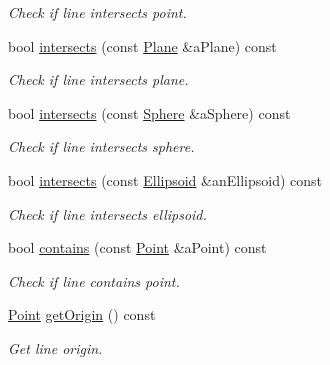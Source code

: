 \begin{DoxyCompactItemize}
\begin{DoxyCompactList}\small\item\em Check if line intersects point. \end{DoxyCompactList}\item 
bool \hyperlink{classlibrary_1_1math_1_1geom_1_1d3_1_1objects_1_1_line_a21d031807956bafc5577ed3b5ac54cbf}{intersects} (const \hyperlink{classlibrary_1_1math_1_1geom_1_1d3_1_1objects_1_1_plane}{Plane} \&a\+Plane) const
\begin{DoxyCompactList}\small\item\em Check if line intersects plane. \end{DoxyCompactList}\item 
bool \hyperlink{classlibrary_1_1math_1_1geom_1_1d3_1_1objects_1_1_line_ab9b35d1e6276d927e9a54219855295ce}{intersects} (const \hyperlink{classlibrary_1_1math_1_1geom_1_1d3_1_1objects_1_1_sphere}{Sphere} \&a\+Sphere) const
\begin{DoxyCompactList}\small\item\em Check if line intersects sphere. \end{DoxyCompactList}\item 
bool \hyperlink{classlibrary_1_1math_1_1geom_1_1d3_1_1objects_1_1_line_a2cc1edf1b60745c518fbf19f2ab0771c}{intersects} (const \hyperlink{classlibrary_1_1math_1_1geom_1_1d3_1_1objects_1_1_ellipsoid}{Ellipsoid} \&an\+Ellipsoid) const
\begin{DoxyCompactList}\small\item\em Check if line intersects ellipsoid. \end{DoxyCompactList}\item 
bool \hyperlink{classlibrary_1_1math_1_1geom_1_1d3_1_1objects_1_1_line_a59b72a3a39134963f5165a03829b17aa}{contains} (const \hyperlink{classlibrary_1_1math_1_1geom_1_1d3_1_1objects_1_1_point}{Point} \&a\+Point) const
\begin{DoxyCompactList}\small\item\em Check if line contains point. \end{DoxyCompactList}\item 
\hyperlink{classlibrary_1_1math_1_1geom_1_1d3_1_1objects_1_1_point}{Point} \hyperlink{classlibrary_1_1math_1_1geom_1_1d3_1_1objects_1_1_line_ad65178573d705ad21bdd54e7f4b7f104}{get\+Origin} () const
\begin{DoxyCompactList}\small\item\em Get line origin. \end{DoxyCompactList}\item 

\end{DoxyCompactItemize}
